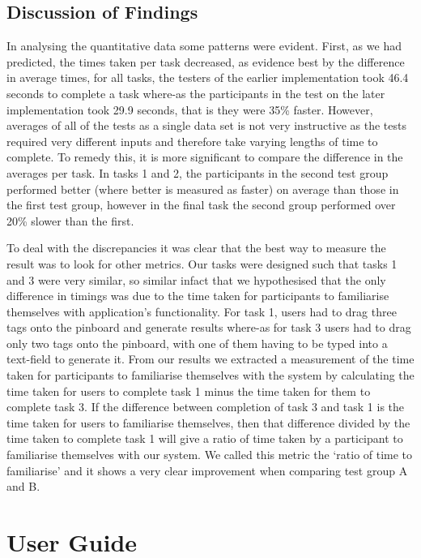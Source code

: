 \documentclass[10pt,a4paper]{article}
\begin{document}
\subsection*{Discussion of Findings}

In analysing the quantitative data some patterns were evident. First, as we had predicted, the times taken per task decreased, as evidence best by the difference in average times, for all tasks, the testers of the earlier implementation took 46.4 seconds to complete a task where-as the participants in the test on the later implementation took 29.9 seconds, that is they were 35\% faster. However, averages of all of the tests as a single data set is not very instructive as the tests required very different inputs and therefore take varying lengths of time to complete. To remedy this, it is more significant to compare the difference in the averages per task. In tasks 1 and 2, the participants in the second test group performed better (where better is measured as faster) on average than those in the first test group, however in the final task the second group performed over 20\% slower than the first. 

To deal with the discrepancies it was clear that the best way to measure the result was to look for other metrics. Our tasks were designed such that tasks 1 and 3 were very similar, so similar infact that we hypothesised that the only difference in timings was due to the time taken for participants to familiarise themselves with application’s functionality. For task 1, users had to drag three tags onto the pinboard and generate results where-as for task 3 users had to drag only two tags onto the pinboard, with one of them having to be typed into a text-field to generate it. From our results we extracted a measurement of the time taken for participants to familiarise themselves with the system by calculating the time taken for users to complete task 1 minus the time taken for them to complete task 3. If the difference between completion of task 3 and task 1 is the time taken for users to familiarise themselves, then that difference divided by the time taken to complete task 1 will give a ratio of time taken by a participant to familiarise themselves with our system. We called this metric the ‘ratio of time to familiarise’ and it shows a very clear improvement when comparing test group A and B. 



\section*{User Guide}
\end{document}
